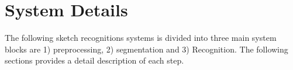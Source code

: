 \documentclass[a4paper,10pt]{IEEEconf}
\begin{document}
%
%    
\section{System Details}
\label{Sysdisc}
The following sketch recognitions systems is divided into three main system blocks are 1) preprocessing, 2) segmentation and 3) Recognition. The following sections provides a detail description of each step.

  
\end{document}
